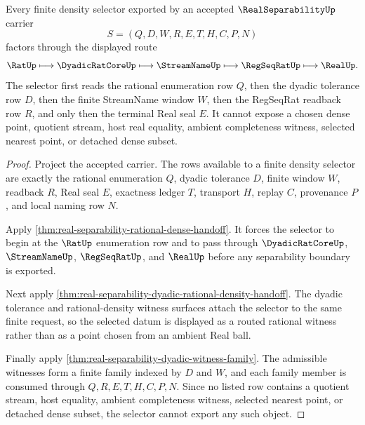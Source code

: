 \begin{theorem}
\label{thm:real-separability-finite-density-selector}
Every finite density selector exported by an accepted $\RealSeparabilityUp$ carrier
$$
S=(Q,D,W,R,E,T,H,C,P,N)
$$
factors through the displayed route
$$
\RatUp \longmapsto \DyadicRatCoreUp \longmapsto \StreamNameUp \longmapsto \RegSeqRatUp \longmapsto \RealUp .
$$
The selector first reads the rational enumeration row $Q$, then the dyadic tolerance row $D$, then the finite StreamName window $W$, then the RegSeqRat readback row $R$, and only then the terminal Real seal $E$. It cannot expose a chosen dense point, quotient stream, host real equality, ambient completeness witness, selected nearest point, or detached dense subset.
\end{theorem}
\begin{proof}
Project the accepted carrier. The rows available to a finite density selector are exactly the rational enumeration $Q$, dyadic tolerance $D$, finite window $W$, readback $R$, Real seal $E$, exactness ledger $T$, transport $H$, replay $C$, provenance $P$, and local naming row $N$.

Apply \autoref{thm:real-separability-rational-dense-handoff}. It forces the selector to begin at the $\RatUp$ enumeration row and to pass through $\DyadicRatCoreUp$, $\StreamNameUp$, $\RegSeqRatUp$, and $\RealUp$ before any separability boundary is exported.

Next apply \autoref{thm:real-separability-dyadic-rational-density-handoff}. The dyadic tolerance and rational-density witness surfaces attach the selector to the same finite request, so the selected datum is displayed as a routed rational witness rather than as a point chosen from an ambient Real ball.

Finally apply \autoref{thm:real-separability-dyadic-witness-family}. The admissible witnesses form a finite family indexed by $D$ and $W$, and each family member is consumed through $Q,R,E,T,H,C,P,N$. Since no listed row contains a quotient stream, host equality, ambient completeness witness, selected nearest point, or detached dense subset, the selector cannot export any such object.
\end{proof}

